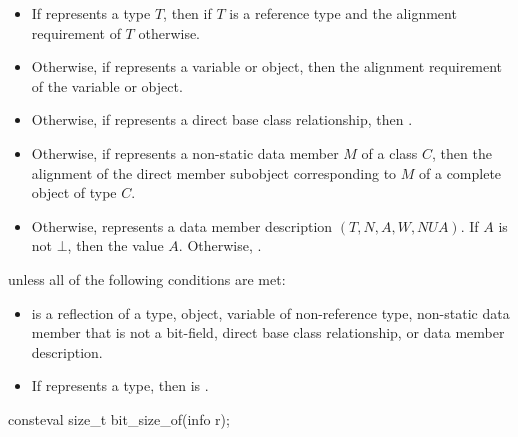 \begin{itemdescr}
\pnum
\returns
\begin{itemize}
\item
  If  represents a type $T$,
  then  if $T$ is a reference type
  and the alignment requirement of $T$ otherwise.
\item
  Otherwise, if  represents a variable or object,
  then the alignment requirement of the variable or object.
\item
  Otherwise, if  represents a direct base class relationship,
  then .
\item
  Otherwise, if  represents a non-static data member $M$ of a class $C$,
  then the alignment of the direct member subobject
  corresponding to $M$ of a complete object of type $C$.
\item
  Otherwise,  represents a data member description
  $(T, N, A, W, \mathit{NUA})$.
  If $A$ is not $\bot$,
  then the value $A$.
  Otherwise, .
\end{itemize}

\pnum
\throws
{} unless
all of the following conditions are met:
\begin{itemize}
\item
{} is a reflection of a
type,
object,
variable of non-reference type,
non-static data member that is not a bit-field,
direct base class relationship, or
data member description.
\item
If  represents a type,
then  is .
\end{itemize}
\end{itemdescr}

%
\begin{itemdecl}
consteval size_t bit_size_of(info r);
\end{itemdecl}

